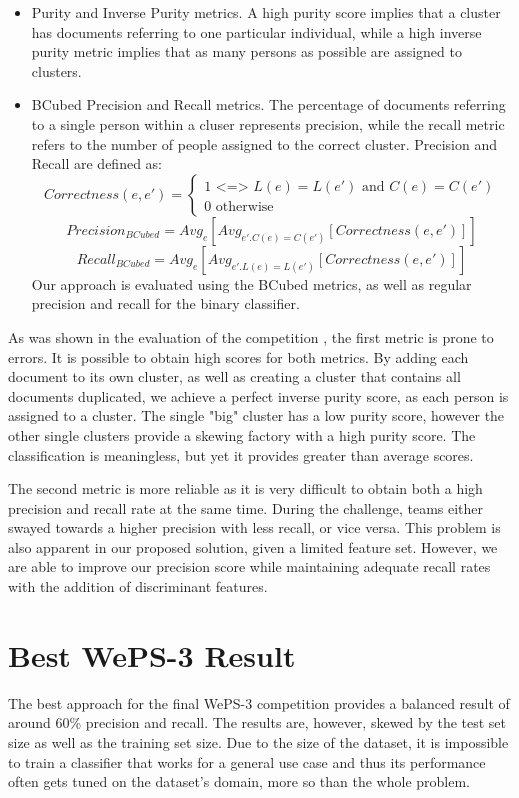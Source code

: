 \begin{itemize}
    \item
      Purity and Inverse Purity metrics.
      A high purity score implies that a cluster has documents referring to one
      particular individual, while a high inverse purity metric implies that as
      many persons as possible are assigned to clusters.
    \item
      BCubed Precision and Recall metrics. \cite{amigo2009comparison}
      The percentage of documents referring to a single person within a cluser
      represents precision, while the recall metric refers to the number of people assigned
      to the correct cluster. Precision and Recall are defined as:
\[
   Correctness(e, e') = 
      \left\{
         \begin{array}{ll}
            1 \mbox { <=> } L(e) = L(e') \mbox { and } C(e) = C(e') \\
            0 \mbox{ otherwise }
         \end{array}
      \right.
\]
\[
   Precision_{BCubed} = Avg_e[Avg_{e'.C(e) = C(e')}[Correctness(e, e')]]
\]
\[
      Recall_{BCubed} = Avg_e[Avg_{e'.L(e) = L(e')}[Correctness(e, e')]]
\]
      Our approach is evaluated using the BCubed metrics, as well as regular
      precision and recall for the binary classifier.
\end{itemize}
As was shown in the evaluation of the competition \cite{weps2-eval}, the first
metric is prone to errors. It is possible to obtain high scores for both metrics.
By adding each document to its own cluster, as well as creating a cluster that contains
all documents duplicated, we achieve a perfect inverse purity score, as each
person is assigned to a cluster. The single "big" cluster has a low purity score, however the
other single clusters provide a skewing factory with a high purity score. The
classification is meaningless, but yet it provides greater than average scores.

The second metric is more reliable as it is very difficult to obtain both a high
precision and recall rate at the same time. During the challenge, teams either swayed
towards a higher precision with less recall, or vice versa. This problem is
also apparent in our proposed solution, given a limited feature set. However,
we are able to improve our precision score while maintaining adequate recall
rates with the addition of discriminant features.

\section{Best WePS-3 Result}
\label{sub-sub-sec:best-weps-result}
The best approach \cite{weps-best} for the final WePS-3 competition provides a
balanced result of around 60\% \cite{weps3-eval} precision and recall. The results
are, however, skewed by the test set size as well as the training set size. Due
to the size of the dataset, it is impossible to train a classifier that works for
a general use case and thus its performance often gets tuned on the dataset's domain,
more so than the whole problem.

